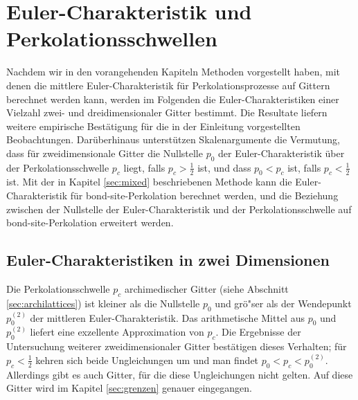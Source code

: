 
\chapter{Euler-Charakteristik und Perkolationsschwellen}
\label{sec:schranken}

Nachdem wir in den vorangehenden Kapiteln Methoden vorgestellt haben, mit denen die mittlere Euler-Charakteristik f\"ur Perkolationsprozesse auf Gittern berechnet werden kann, werden im Folgenden die Euler-Charakter\-ist\-iken einer Vielzahl zwei- und dreidimensionaler Gitter bestimmt. Die Resultate liefern weitere empirische Best\"atigung f\"ur die in der Einleitung vorgestellten Beobachtungen. Dar\"uberhinaus unterst\"utzen Skalenargumente die Vermutung, dass f\"ur zweidimensionale Gitter die Nullstelle $p_0$ der Euler-Charakteristik \"uber der Perkolationsschwelle $p_c$ liegt, falls $p_c>\frac{1}{2}$ ist, und dass $p_0<p_c$ ist, falls $p_c<\frac{1}{2}$ ist. Mit der in Kapitel \ref{sec:mixed} beschriebenen Methode kann die Euler-Charakteristik f\"ur bond-site-Perkolation berechnet werden, und die Beziehung zwischen der Nullstelle der Euler-Charakteristik und der Perkolationsschwelle auf bond-site-Perkolation erweitert werden.


\section{Euler-Charakteristiken in zwei Dimensionen}

Die Perkolationsschwelle $p_c$ archimedischer Gitter (siehe Abschnitt \ref{sec:archilattices}) ist kleiner als die Nullstelle $p_0$ und gr\"o"ser als der Wendepunkt $p_0^{(2)}$ der mittleren Euler-Charakteristik. Das arithmetische Mittel aus $p_0$ und $p_0^{(2)}$ liefert eine exzellente Approximation von $p_c$. Die Ergebnisse der Untersuchung weiterer zweidimensionaler Gitter best\"atigen dieses Verhalten; f\"ur $p_c<\frac{1}{2}$ kehren sich beide Ungleichungen um und man findet $p_0<p_c<p_0^{(2)}$. Allerdings gibt es auch Gitter, f\"ur die diese Ungleichungen nicht gelten. Auf diese Gitter wird im Kapitel \ref{sec:grenzen} genauer eingegangen.

